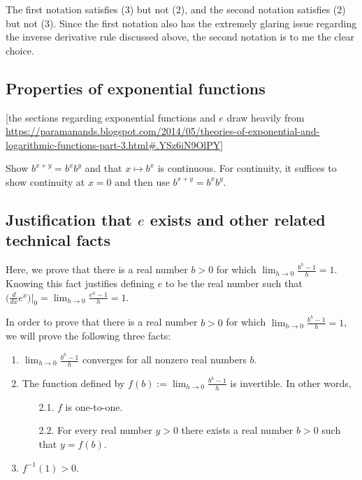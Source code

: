 The first notation satisfies (3) but not (2), and the second notation satisfies (2) but not (3). Since the first notation also has the extremely glaring issue regarding the inverse derivative rule discussed above, the second notation is to me the clear choice.

\subsection*{Properties of exponential functions}

[the sections regarding exponential functions and $e$ draw heavily from \url{https://paramanands.blogspot.com/2014/05/theories-of-exponential-and-logarithmic-functions-part-3.html#.YSz6iN9OlPY}]

Show $b^{x + y} = b^x b^y$ and that $x \mapsto b^x$ is continuous. For continuity, it suffices to show continuity at $x = 0$ and then use $b^{x + y} = b^x b^y$.

\subsection*{Justification that $e$ exists and other related technical facts}

Here, we prove that there is a real number $b > 0$ for which $\lim_{h \rightarrow 0} \frac{b^h - 1}{h} = 1$. Knowing this fact justifies defining $e$ to be the real number such that ${\Big( \frac{d}{dx} e^x \Big)\Big|_0 = \lim_{h \rightarrow 0} \frac{e^h - 1}{h} = 1}$.

In order to prove that there is a real number $b > 0$ for which $\lim_{h \rightarrow 0} \frac{b^h - 1}{h} = 1$, we will prove the following three facts:

\begin{enumerate}
    \item $\lim_{h \rightarrow 0} \frac{b^h - 1}{h}$ converges for all nonzero real numbers $b$.
    \item The function defined by $f(b) := \lim_{h \rightarrow 0} \frac{b^h - 1}{h}$ is invertible. In other words, 
    \begin{enumerate}
        \item[2.1.] $f$ is one-to-one.
        \item[2.2.] For every real number $y > 0$ there exists a real number $b > 0$ such that $y = f(b)$.
    \end{enumerate}
    \item $f^{-1}(1) > 0$.
\end{enumerate}

